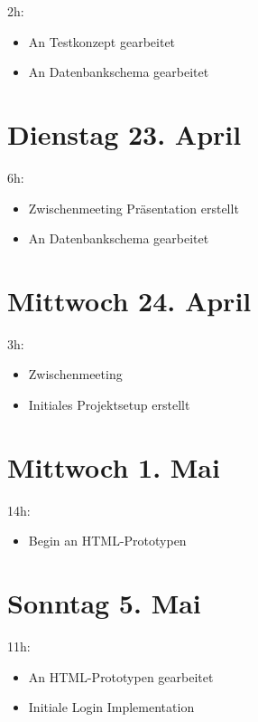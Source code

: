 2h:

\begin{itemize}
  \tightlist
  \item
        An Testkonzept gearbeitet
  \item
        An Datenbankschema gearbeitet
\end{itemize}

\section{Dienstag 23. April}\label{dienstag-23.april}

6h:

\begin{itemize}
  \tightlist
  \item
        Zwischenmeeting Präsentation erstellt
  \item
        An Datenbankschema gearbeitet
\end{itemize}

\section{Mittwoch 24. April}\label{mittwoch-24.april}

3h:

\begin{itemize}
  \tightlist
  \item
        Zwischenmeeting
  \item
        Initiales Projektsetup erstellt
\end{itemize}

\section{Mittwoch 1. Mai}\label{mittwoch-1.mai}

14h:

\begin{itemize}
  \tightlist
  \item
        Begin an HTML-Prototypen
\end{itemize}

\section{Sonntag 5. Mai}\label{sonntag-5.mai}

11h:

\begin{itemize}
  \tightlist
  \item
        An HTML-Prototypen gearbeitet
  \item
        Initiale Login Implementation
\end{itemize}

